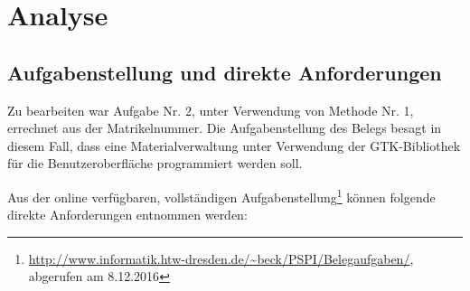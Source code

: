 \section{Analyse}
\subsection{Aufgabenstellung und direkte Anforderungen}
Zu bearbeiten war Aufgabe Nr. 2, unter Verwendung von Methode Nr. 1, errechnet aus der Matrikelnummer.
Die Aufgabenstellung des Belegs besagt in diesem Fall, dass eine Materialverwaltung unter Verwendung der GTK-Bibliothek
für die Benutzeroberfläche programmiert werden soll.

\bigskip

\noindent
Aus der online verfügbaren, vollständigen Aufgabenstellung\footnote{\url{http://www.informatik.htw-dresden.de/~beck/PSPI/Belegaufgaben/},
abgerufen am 8.12.2016} können folgende direkte Anforderungen entnommen werden:

